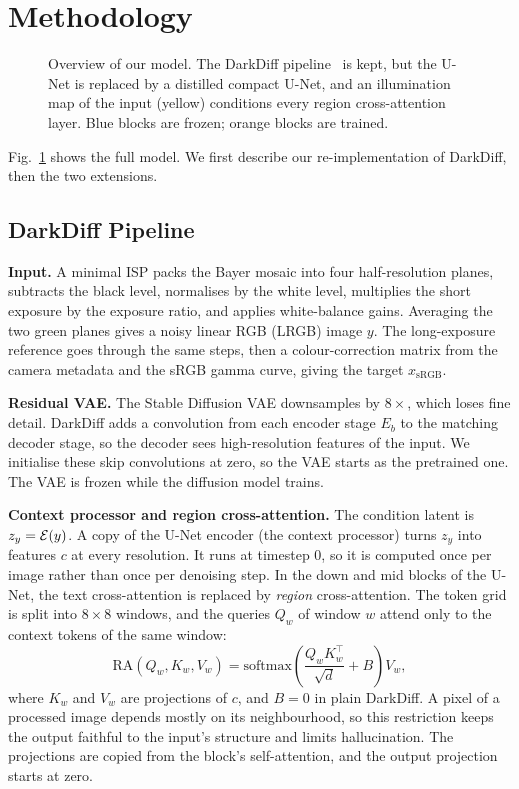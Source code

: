 \section{Methodology}
\label{sec:method}

\begin{figure}[t]
  \centering
  
  \caption{Overview of our model. The DarkDiff pipeline~\cite{zheng2025darkdiff} is kept, but the
  \sdtwo{} U-Net is replaced by a distilled compact U-Net, and an illumination map of the input
  (yellow) conditions every region cross-attention layer. Blue blocks are frozen; orange
  blocks are trained.}
  \label{fig:pipeline}
\end{figure}

Fig.~\ref{fig:pipeline} shows the full model. We first describe our re-implementation of
DarkDiff, then the two extensions.

\subsection{DarkDiff Pipeline}
\label{sec:darkdiff}

\textbf{Input.}
A minimal ISP packs the Bayer mosaic into four half-resolution planes, subtracts the black level,
normalises by the white level, multiplies the short exposure by the exposure ratio, and applies
white-balance gains. Averaging the two green planes gives a noisy linear RGB (LRGB) image $y$.
The long-exposure reference goes through the same steps, then a colour-correction matrix from the
camera metadata and the sRGB gamma curve, giving the target $x_{\mathrm{sRGB}}$.

\textbf{Residual VAE.}
The Stable Diffusion VAE downsamples by $8\times$, which loses fine detail. DarkDiff adds a
convolution from each encoder stage $E_b$ to the matching decoder stage, so the decoder sees
high-resolution features of the input. We initialise these skip convolutions at zero, so the VAE
starts as the pretrained one. The VAE is frozen while the diffusion model trains.

\textbf{Context processor and region cross-attention.}
The condition latent is $z_y = \mathcal{E}(y)$. A copy of the U-Net encoder (the context processor)
turns $z_y$ into features $c$ at every resolution. It runs at timestep 0, so it is computed once
per image rather than once per denoising step. In the down and mid blocks of the U-Net, the text
cross-attention is replaced by \emph{region} cross-attention. The token grid is split into
$8\times 8$ windows, and the queries $Q_w$ of window $w$ attend only to the context tokens of the
same window:
\begin{equation}
  \mathrm{RA}(Q_w, K_w, V_w) = \mathrm{softmax}\!\left(\frac{Q_w K_w^{\top}}{\sqrt{d}} + B\right) V_w ,
  \label{eq:region}
\end{equation}
where $K_w$ and $V_w$ are projections of $c$, and $B=0$ in plain DarkDiff. A pixel of a
processed image depends mostly on its neighbourhood, so this restriction keeps the output faithful
to the input's structure and limits hallucination. The projections are copied from the block's
self-attention, and the output projection starts at zero.

